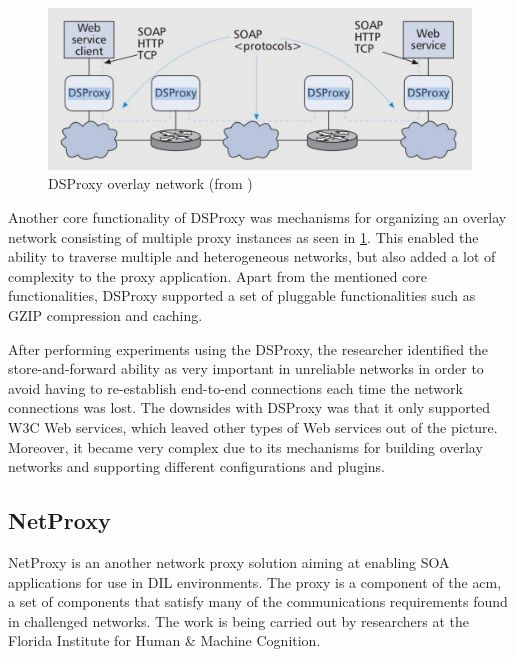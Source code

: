 \begin{figure}[h]
\includegraphics[scale=0.35]{images/dsproxy.pdf}
\caption{DSProxy overlay network (from \cite{ieee-dsproxy} )}
\label{figure:dsproxy}
\end{figure}

Another core functionality of DSProxy was mechanisms for organizing an overlay
network consisting of multiple proxy instances as seen in \cref{figure:dsproxy}.
This enabled the ability to traverse multiple and heterogeneous networks, but
also added a lot of complexity to the proxy application. Apart from the
mentioned core functionalities, DSProxy supported a set of pluggable
functionalities such as GZIP compression and caching.

After performing experiments using the DSProxy, the researcher identified the
store-and-forward ability as very important in unreliable networks in order to
avoid having to re-establish end-to-end connections each time the network
connections was lost\cite{dsproxy-ffi}. The downsides with DSProxy was that it
only supported W3C Web services, which leaved other types of Web services out of
the picture. Moreover, it became very complex due to its mechanisms for building
overlay networks and supporting different configurations and plugins.

\subsection{NetProxy}

NetProxy is an another network proxy solution aiming at enabling SOA
applications for use in DIL environments\cite{suri-netproxy}. The proxy is a
component of the \gls{acm}, a set of components that satisfy many of the
communications requirements found in challenged networks. The work is being
carried out by researchers at the Florida Institute for Human \& Machine
Cognition.

